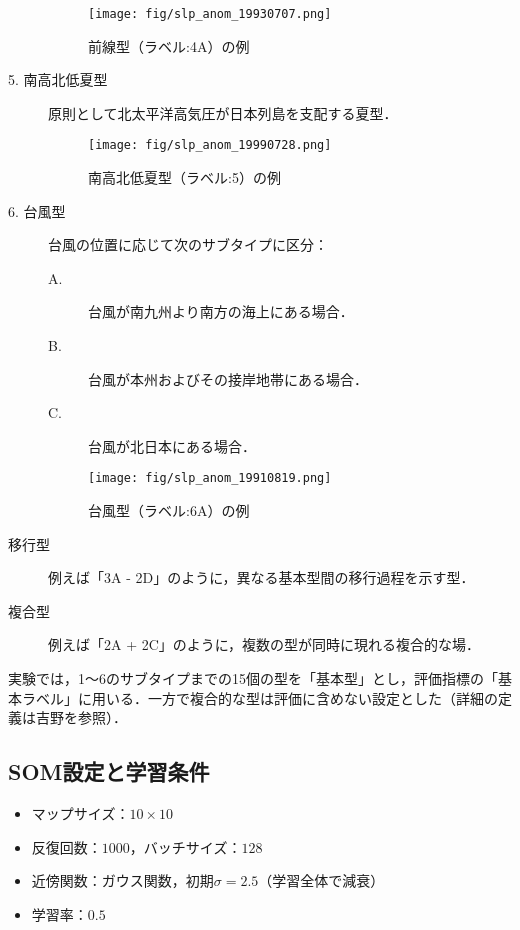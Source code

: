 \documentclass{jarticle}
\theoremstyle{definition}
\begin{document}
\begin{description}
\begin{figure}[H] \centering \texttt{[image: fig/slp\_anom\_19930707.png]} \caption{前線型（ラベル:4A）の例} \label{fig:slp_anom_19930707} \end{figure}

\item[5. 南高北低夏型] 原則として北太平洋高気圧が日本列島を支配する夏型．

\begin{figure}[H] \centering \texttt{[image: fig/slp\_anom\_19990728.png]} \caption{南高北低夏型（ラベル:5）の例} \label{fig:slp_anom_19990728} \end{figure}

\item[6. 台風型] 台風の位置に応じて次のサブタイプに区分：
  \begin{description}
    \item[A.] 台風が南九州より南方の海上にある場合．
    \item[B.] 台風が本州およびその接岸地帯にある場合．
    \item[C.] 台風が北日本にある場合．
  \end{description}

\begin{figure}[H] \centering \texttt{[image: fig/slp\_anom\_19910819.png]} \caption{台風型（ラベル:6A）の例} \label{fig:slp_anom_19910819} \end{figure}
  
\item[移行型] 例えば「3A - 2D」のように，異なる基本型間の移行過程を示す型．
\item[複合型] 例えば「2A + 2C」のように，複数の型が同時に現れる複合的な場．
\end{description}

実験では，1〜6のサブタイプまでの15個の型を「基本型」とし，評価指標の「基本ラベル」に用いる．一方で複合的な型は評価に含めない設定とした（詳細の定義は吉野\cite{吉野2002日本の気候}を参照）．

\subsection{SOM設定と学習条件}
\begin{itemize}
\item マップサイズ：$10\times 10$
\item 反復回数：$1000$，バッチサイズ：$128$
\item 近傍関数：ガウス関数，初期$\sigma=2.5$（学習全体で減衰）
\item 学習率：$0.5$
\end{itemize}
\end{document}
